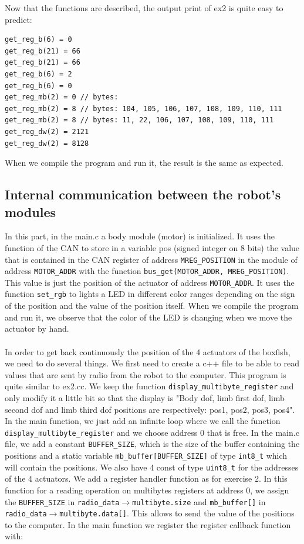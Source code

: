 \documentclass[11pt]{article}
\begin{document}
Now that the functions are described, the output print of ex2 is quite easy to predict:

\begin{verbatim}
get_reg_b(6) = 0 
get_reg_b(21) = 66
get_reg_b(21) = 66
get_reg_b(6) = 2
get_reg_b(6) = 0
get_reg_mb(2) = 0 // bytes:
get_reg_mb(2) = 8 // bytes: 104, 105, 106, 107, 108, 109, 110, 111
get_reg_mb(2) = 8 // bytes: 11, 22, 106, 107, 108, 109, 110, 111
get_reg_dw(2) = 2121
get_reg_dw(2) = 8128
\end{verbatim}

When we compile the program and run it, the result is the same as expected.



\subsection{Internal communication between the robot's modules}

In this part, in the main.c a body module (motor) is initialized. It uses the function of the CAN to store in a variable pos (signed integer on 8 bits) the value that is contained in the CAN register of address \texttt{MREG\_POSITION} in the module of address \texttt{MOTOR\_ADDR} with the function \texttt{bus\_get(MOTOR\_ADDR, MREG\_POSITION)}. This value is just the position of the actuator of address \texttt{MOTOR\_ADDR}. It uses the function \texttt{set\_rgb} to lights a LED in different color ranges depending on the sign of the position and the value of the position itself. When we compile the program and run it, we observe that the color of the LED is changing when we move the actuator by hand.
\\
\\
In order to get back continuously the position of the 4 actuators of the boxfish, we need to do several things. We first need to create a c++ file to be able to read values that are sent by radio from the robot to the computer. This program is quite similar to ex2.cc. We keep the function \texttt{display\_multibyte\_register} and only modify it a little bit so that the display is "Body dof, limb first dof, limb second dof and limb third dof positions are respectively: pos1, pos2, pos3, pos4". In the main function, we just add an infinite loop where we call the function \texttt{display\_multibyte\_register} and we choose address 0 that is free. In the main.c file, we add a constant \texttt{BUFFER\_SIZE}, which is the size of the buffer containing the positions and a static variable \texttt{mb\_buffer[BUFFER\_SIZE]} of type \texttt{int8\_t} which will contain the positions. We also have 4 const of type \texttt{uint8\_t} for the addresses of the 4 actuators. We add a register handler function as for exercise 2. In this function for a reading operation on multibytes registers at address 0, we assign the \texttt{BUFFER\_SIZE} in \texttt{radio\_data}${\rightarrow}$\texttt{multibyte.size} and \texttt{mb\_buffer[]} in \texttt{radio\_data}${\rightarrow}$\texttt{multibyte.data[]}. This allows to send the value of the positions to the computer. In the main function we register the register callback function with:
\end{document}
